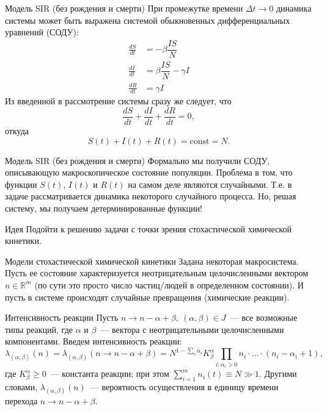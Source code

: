 \documentclass[aspectratio=169]{beamer}
\begin{document}
\begin{frame}{Модель SIR (без рождения и смерти)}
    При промежутке времени $\Delta t \to 0$ динамика системы может быть выражена системой обыкновенных дифференциальных уравнений (СОДУ):
    \begin{align*}
        \frac{dS}{dt} &= - \beta \dfrac{IS}{N} \\
        \frac{dI}{dt} &= \beta \dfrac{IS}{N} - \gamma I \\
        \frac{dR}{dt} &= \gamma I
    \end{align*}
    Из введенной в рассмотрение системы сразу же следует, что
    \begin{equation*}
        \frac{dS}{dt} + \frac{dI}{dt} + \frac{dR}{dt} = 0,
    \end{equation*}
    откуда
    \begin{equation*}
        S(t) + I(t) + R(t) = \mathrm{const} = N.
    \end{equation*}
\end{frame}
\begin{frame}{Модель SIR (без рождения и смерти)}
    Формально мы получили СОДУ, описывающую макроскопическое состояние популяции. Проблема в том, что функции $S(t)$, $I(t)$ и $R(t)$ на самом деле являются \alert{случайными}. Т.е. в задаче рассматривается динамика некоторого случайного процесса. Но, решая систему, мы получаем \alert{детерминированные} функции! 
    \begin{block}{Идея}
        Подойти к решению задачи с точки зрения стохастической химической кинетики.
    \end{block}
\end{frame}
\begin{frame}{Модели стохастической химической кинетики}
    Задана некоторая макросистема. Пусть ее состояние характеризуется неотрицательным целочисленными вектором $n \in \mathbb{R}^m$ (по сути это просто число частиц/людей в определенном состоянии). И пусть в системе происходят случайные превращения (химические реакции).
    \begin{block}{Интенсивность реакции}
        Пусть $n \to n - \alpha + \beta, \ (\alpha, \beta) \in J$~--- все возможные типы реакций, где $\alpha$ и $\beta$~--- вектора с неотрицательными целочисленными компонентами. Введем интенсивность реакции:
        \[ \lambda_{(\alpha, \beta)}(n) = \lambda_{(\alpha, \beta)}(n \to n - \alpha + \beta) = N^{1 - \sum\limits_{i} \alpha_i} K^{\alpha}_{\beta} \prod_{i: \alpha_i > 0} n_i \cdot \ldots \cdot (n_i - \alpha_i + 1), \]
        где $K^{\alpha}_{\beta} \geqslant 0$~--- константа реакции; при этом $\sum\limits_{i=1}^m n_i(t) \equiv N \gg 1$. Другими словами, $\lambda_{(\alpha, \beta)}(n)$~--- вероятность осуществления в единицу времени перехода $n \to n - \alpha + \beta$.
    \end{block}
\end{frame}
\end{document}
